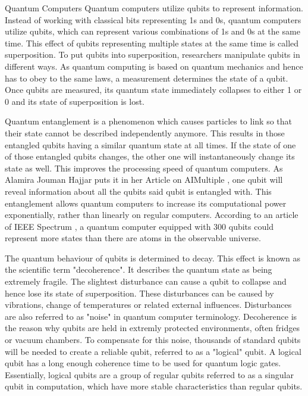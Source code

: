 \documentclass[aps,preprintnumbers,twocolumn]{revtex4}
\begin{document}
\begin{section}{Quantum Computers}
Quantum computers utilize qubits to represent information. 
Instead of working with classical bits representing 1s and 0s, 
quantum computers utilize qubits, which can represent various combinations of 1s and 0s at the same time. 
This effect of qubits representing multiple states at the same time is called superposition. To put qubits into superposition, 
researchers manipulate qubits in different ways. As quantum computing is based on quantum mechanics and hence has to obey to the same laws, 
a measurement determines the state of a qubit. Once qubits are measured, 
its quantum state immediately collapses to either 1 or 0 and its state of superposition is lost.

Quantum entanglement is a phenomenon which causes particles to link so that their state cannot be described independently anymore.
This results in those entangled qubits having a similar quantum state at all times.
If the state of one of those entangled qubits changes,
the other one will instantaneously change its state as well. This improves the processing speed of quantum computers. As Alamira Jouman Hajjar puts it in her Article on AIMultiple \cite{AIMultiple}, one qubit will reveal information about all the qubits said qubit is entangled with.
This entanglement allows quantum computers to increase its computational power exponentially,
rather than linearly on regular computers.
According to an article of IEEE Spectrum \cite{IEEE}, a quantum computer equipped with 300 qubits could represent more states than there are atoms in the observable universe.

The quantum behaviour of qubits is determined to decay.
This effect is known as the scientific term "decoherence".
It describes the quantum state as being extremely fragile.
The slightest disturbance can cause a qubit to collapse and hence lose its state of superposition.
These disturbances can be caused by vibrations, change of temperatures or related external influences.
Disturbances are also referred to as "noise" in quantum computer terminology.
Decoherence is the reason why qubits are held in extremly protected environments, 
often fridges or vacuum chambers.
To compensate for this noise, 
thousands of standard qubits will be needed to create a reliable qubit, 
referred to as a "logical" qubit. 
A logical qubit has a long enough coherence time to be used for quantum logic gates. 
Essentially, logical qubits are a group of regular qubits referred to as a singular qubit in computation, 
which have more stable characteristics than regular qubits.


\end{section}
\end{document}

